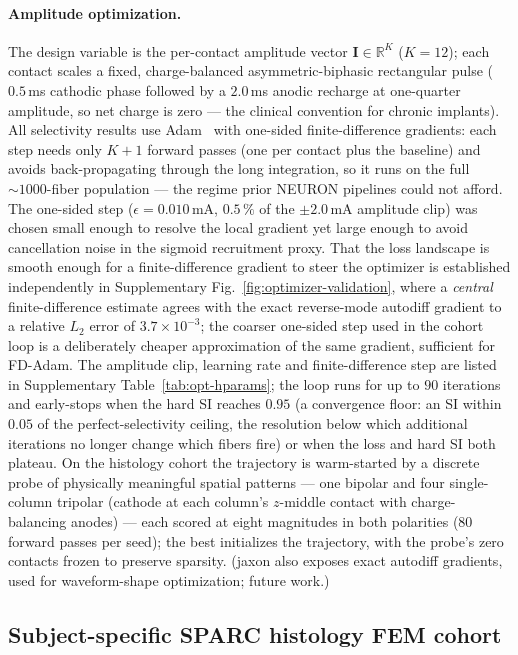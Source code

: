 \paragraph{Amplitude optimization.}
The design variable is the per-contact amplitude vector
$\mathbf{I} \in \mathbb{R}^K$ ($K=12$); each contact scales a fixed,
charge-balanced asymmetric-biphasic rectangular pulse ($0.5\,$ms
cathodic phase followed by a $2.0\,$ms anodic recharge at one-quarter
amplitude, so net charge is zero --- the clinical convention for
chronic implants).  All selectivity results use
Adam~\cite{kingma2015adam} with one-sided finite-difference gradients:
each step needs only $K{+}1$ forward passes (one per contact plus the
baseline) and avoids back-propagating through the long integration, so
it runs on the full ${\sim}1000$-fiber population --- the regime prior
NEURON pipelines could not afford.  The one-sided step
($\epsilon = 0.010\,$mA, $0.5\,\%$ of the $\pm2.0\,$mA amplitude clip)
was chosen small enough to resolve the local gradient yet large enough
to avoid cancellation noise in the sigmoid recruitment proxy.  That the
loss landscape is smooth enough for a finite-difference gradient to
steer the optimizer is established independently in Supplementary
Fig.~\ref{fig:optimizer-validation}, where a \emph{central}
finite-difference estimate agrees with the exact reverse-mode autodiff
gradient to a relative $L_2$ error of $3.7\times10^{-3}$; the coarser
one-sided step used in the cohort loop is a deliberately cheaper
approximation of the same gradient, sufficient for FD-Adam.
The amplitude clip, learning rate and finite-difference step are listed
in Supplementary Table~\ref{tab:opt-hparams}; the loop runs for up to $90$
iterations and early-stops when the hard SI reaches $0.95$ (a
convergence floor: an SI within $0.05$ of the perfect-selectivity
ceiling, the resolution below which additional iterations no longer
change which fibers fire) or when the loss and hard SI both plateau.  On the histology cohort the trajectory is
warm-started by a discrete probe of physically meaningful spatial
patterns --- one bipolar and four single-column tripolar (cathode at
each column's $z$-middle contact with charge-balancing anodes) --- each
scored at eight magnitudes in both polarities ($80$ forward passes per
seed); the best initializes the trajectory, with the probe's zero
contacts frozen to preserve sparsity.  (jaxon also exposes exact
autodiff gradients, used for waveform-shape optimization; future work.)

\subsection{Subject-specific SPARC histology FEM cohort}
\label{sec:methods-duke}

